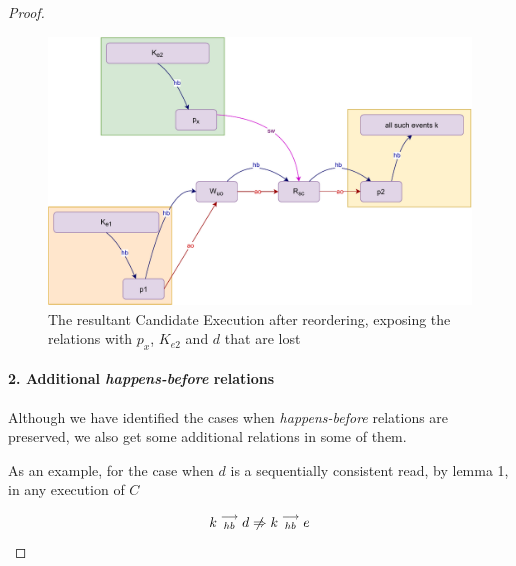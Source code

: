 \begin{proof}
         \begin{figure}[H]
            \centering
            \includegraphics[scale=0.7]{Q1(f).pdf}
            \caption{The resultant Candidate Execution after reordering, exposing the relations with $p_x$, $K_{e2}$ and $d$ that are lost}
            \label{fig:my_label}
        \end{figure}
        
        
        
        
        \paragraph{2. Additional \textit{happens-before} relations}
        Although we have identified the cases when \textit{happens-before} relations are preserved, we also get some additional relations in some of them.
        
        As an example, for the case when $d$ is a sequentially consistent read, by lemma 1, in any execution of $C$
        
        \[
            \reln{k}{hb}{d} \centernot\Rightarrow \reln{k}{hb}{e} 
        \]
        

\end{proof}

